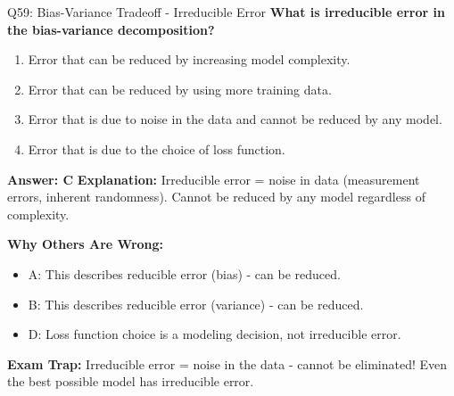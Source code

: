 \documentclass[8pt]{beamer}
\begin{document}
	\begin{frame}{Q59: Bias-Variance Tradeoff - Irreducible Error}
		\fontsize{6.5}{7.5}\selectfont
		\textbf{What is irreducible error in the bias-variance decomposition?}
		
		\begin{enumerate}
			\item Error that can be reduced by increasing model complexity.
			\item Error that can be reduced by using more training data.
			\item Error that is due to noise in the data and cannot be reduced by any model.
			\item Error that is due to the choice of loss function.
		\end{enumerate}
		
		\vspace{0.05cm}
		\textcolor{myblue}{\textbf{Answer: C}}
		\vspace{0.05cm}
		\textcolor{myblue}{\textbf{Explanation:}} Irreducible error = noise in data (measurement errors, inherent randomness). Cannot be reduced by any model regardless of complexity.
		
		\vspace{0.05cm}
		\textcolor{myred}{\textbf{Why Others Are Wrong:}}
		\begin{itemize}
			\item \textcolor{myred}{A:} This describes reducible error (bias) - can be reduced.
			\item \textcolor{myred}{B:} This describes reducible error (variance) - can be reduced.
			\item \textcolor{myred}{D:} Loss function choice is a modeling decision, not irreducible error.
		\end{itemize}
		
		\textcolor{myred}{\textbf{Exam Trap:}} Irreducible error = \textcolor{myblue}{noise in the data} - cannot be eliminated! Even the best possible model has irreducible error.
	\end{frame}
	
\end{document}
